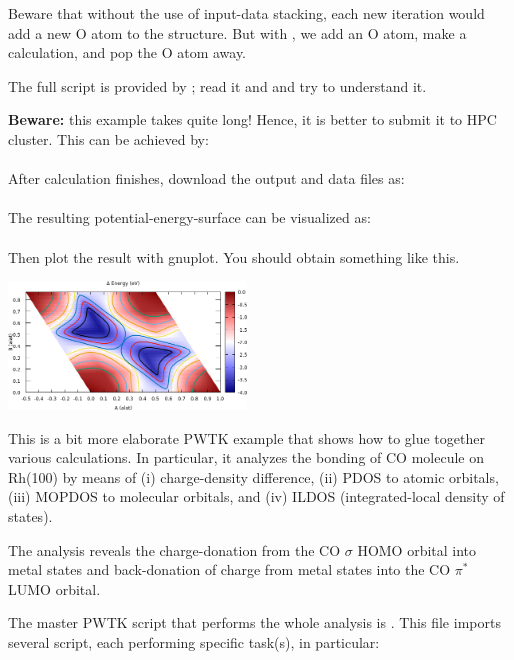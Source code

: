 \documentclass[landscape]{foils}
\begin{document}
Beware that without the use of input-data stacking, each new iteration
would add a new O atom to the structure. But with , we add an O atom, make a calculation, and pop the O atom
away.

The full script is provided by ; read it and and try
to understand it.

{\bf Beware:} this example takes quite long! Hence, it is better to
submit it to HPC cluster. This can be achieved by:\\[0.5em]
\\[0.5em]
After calculation finishes, download the output and data files as:\\[0.5em]
\\[0.5em]
The resulting potential-energy-surface can be visualized as:\\[0.5em]
\\[0.5em]
Then plot the result with gnuplot. You should obtain something like
this.\\

\centerline{\includegraphics[width=0.475\textwidth]{figs/PES-2D.png}}



This is a bit more elaborate PWTK example that shows how to glue
together various calculations. In particular, it analyzes the bonding
of CO molecule on Rh(100) by means of (i) charge-density difference,
(ii) PDOS to atomic orbitals, (iii) MOPDOS to molecular orbitals, and
(iv) ILDOS (integrated-local density of states).

The analysis reveals the charge-donation from the CO $\sigma$ HOMO
orbital into metal states and back-donation of charge from metal
states into the CO $\pi^*$ LUMO orbital.

The master PWTK script that performs the whole analysis is
. This file imports several script, each performing
specific task(s), in particular:
\end{document}
